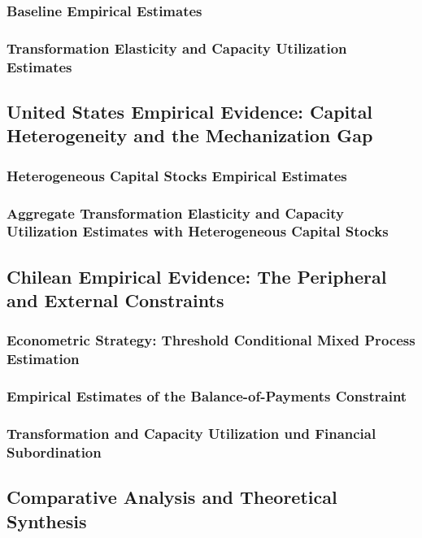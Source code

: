 \subsubsection{Baseline Empirical Estimates}

\subsubsection{Transformation Elasticity and Capacity Utilization Estimates}




\subsection{United States Empirical Evidence: Capital Heterogeneity and the Mechanization Gap}


\subsubsection{Heterogeneous Capital Stocks Empirical Estimates}


\subsubsection{Aggregate Transformation Elasticity and Capacity Utilization Estimates with Heterogeneous Capital Stocks}


\subsection{Chilean Empirical Evidence: The Peripheral and External Constraints}

\subsubsection{Econometric Strategy: Threshold Conditional Mixed Process Estimation}


\subsubsection{Empirical Estimates of the Balance-of-Payments Constraint}

\subsubsection{Transformation and Capacity Utilization und Financial Subordination}



\subsection{Comparative Analysis and Theoretical Synthesis}


